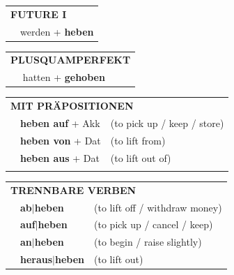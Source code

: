 \documentclass[10pt,a4paper]{revtex4-2}
\begin{document}
\begin{verbbox}
\begin{tabular}{rl}
    \multicolumn{2}{l}{\textbf{FUTURE I} }\\
   & werden + \textbf{heben}\\
 
  \end{tabular}
\hfill
   \begin{tabular}{rl}
      \multicolumn{2}{l}{\textbf{PLUSQUAMPERFEKT}}\\
   & hatten + \textbf{gehoben}\\
  \end{tabular}

   \vspace{10pt}

   \begin{tabular}{lll}
      \multicolumn{3}{l}{\textbf{MIT PRÄPOSITIONEN}}\\
& \textbf{heben auf} + Akk & (to pick up / keep / store)\\
& \textbf{heben von} + Dat & (to lift from)\\
& \textbf{heben aus} + Dat & (to lift out of)\\
\vspace{10pt}
   \end{tabular}
  \hfill
   \begin{tabular}{lll}
      \multicolumn{3}{l}{\textbf{TRENNBARE VERBEN}}\\
 & \textbf{ab$|$heben} & (to lift off / withdraw money)\\
 & \textbf{auf$|$heben} & (to pick up / cancel / keep)\\
 & \textbf{an$|$heben} & (to begin / raise slightly)\\
 & \textbf{heraus$|$heben} & (to lift out)\\
  \end{tabular}

\vspace{-5pt}


\end{verbbox}
\end{document}
